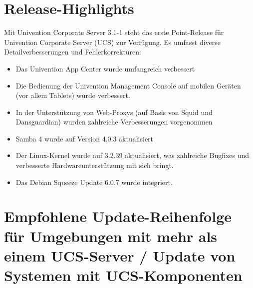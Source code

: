


\newcommand{\ucsManualTitle}{UCS 3.1-1 Release Notes}
\newcommand{\ucsManualSubtitle}{Release Notes für die Inbetriebnahme und
Aktualisierung von Univention Corporate Server (UCS) 3.1-1}
\newcommand{\ucsManualVersion}{3.1-1}
\newcommand{\ucsTechAuthor}{ & Univention GmbH & feedback@univention.de}

\setcounter{secnumdepth}{3}
\setcounter{tocdepth}{3}



\chapter{Release-Highlights}

Mit Univention Corporate Server 3.1-1 steht das erste Point-Release für
Univention Corporate Server (UCS) zur Verfügung. Es umfasst
diverse Detailverbesserungen und Fehlerkorrekturen:

\begin{itemize}
\item Das Univention App Center wurde umfangreich verbessert
\item Die Bedienung der Univention Management Console auf mobilen
Geräten (vor allem Tablets) wurde verbessert.
\item In der Unterstützung von Web-Proxys (auf Basis von Squid und
Dansguardian) wurden zahlreiche Verbesserungen vorgenommen
\item Samba 4 wurde auf Version 4.0.3 aktualisiert
\item Der Linux-Kernel wurde auf 3.2.39 aktualisiert, was zahlreiche
Bugfixes und verbesserte Hardwareunterstützung mit sich bringt.
\item Das Debian Squeeze Update 6.0.7 wurde integriert.
\end{itemize}

\chapter{Empfohlene Update-Reihenfolge für Umgebungen mit mehr als einem UCS-Server / Update von Systemen mit UCS-Komponenten}

